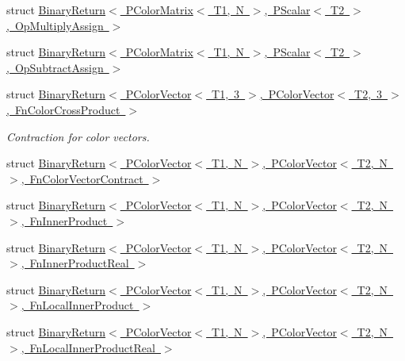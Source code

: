 \begin{DoxyCompactItemize}
\item 
struct \mbox{\hyperlink{structENSEM_1_1BinaryReturn_3_01PColorMatrix_3_01T1_00_01N_01_4_00_01PScalar_3_01T2_01_4_00_01OpMultiplyAssign_01_4}{Binary\+Return$<$ P\+Color\+Matrix$<$ T1, N $>$, P\+Scalar$<$ T2 $>$, Op\+Multiply\+Assign $>$}}
\item 
struct \mbox{\hyperlink{structENSEM_1_1BinaryReturn_3_01PColorMatrix_3_01T1_00_01N_01_4_00_01PScalar_3_01T2_01_4_00_01OpSubtractAssign_01_4}{Binary\+Return$<$ P\+Color\+Matrix$<$ T1, N $>$, P\+Scalar$<$ T2 $>$, Op\+Subtract\+Assign $>$}}
\item 
struct \mbox{\hyperlink{structENSEM_1_1BinaryReturn_3_01PColorVector_3_01T1_00_013_01_4_00_01PColorVector_3_01T2_00_013_ba40478e41b9dc719d7fd5b6b54bac05}{Binary\+Return$<$ P\+Color\+Vector$<$ T1, 3 $>$, P\+Color\+Vector$<$ T2, 3 $>$, Fn\+Color\+Cross\+Product $>$}}
\begin{DoxyCompactList}\small\item\em Contraction for color vectors. \end{DoxyCompactList}\item 
struct \mbox{\hyperlink{structENSEM_1_1BinaryReturn_3_01PColorVector_3_01T1_00_01N_01_4_00_01PColorVector_3_01T2_00_01N_62be6e61418b73621b95945775a1489e}{Binary\+Return$<$ P\+Color\+Vector$<$ T1, N $>$, P\+Color\+Vector$<$ T2, N $>$, Fn\+Color\+Vector\+Contract $>$}}
\item 
struct \mbox{\hyperlink{structENSEM_1_1BinaryReturn_3_01PColorVector_3_01T1_00_01N_01_4_00_01PColorVector_3_01T2_00_01N_01_4_00_01FnInnerProduct_01_4}{Binary\+Return$<$ P\+Color\+Vector$<$ T1, N $>$, P\+Color\+Vector$<$ T2, N $>$, Fn\+Inner\+Product $>$}}
\item 
struct \mbox{\hyperlink{structENSEM_1_1BinaryReturn_3_01PColorVector_3_01T1_00_01N_01_4_00_01PColorVector_3_01T2_00_01N_ff22724b5ff700ded585f8698a23ac47}{Binary\+Return$<$ P\+Color\+Vector$<$ T1, N $>$, P\+Color\+Vector$<$ T2, N $>$, Fn\+Inner\+Product\+Real $>$}}
\item 
struct \mbox{\hyperlink{structENSEM_1_1BinaryReturn_3_01PColorVector_3_01T1_00_01N_01_4_00_01PColorVector_3_01T2_00_01N_ed73dfc7a4532c23f28b4a2b6ca4e4e7}{Binary\+Return$<$ P\+Color\+Vector$<$ T1, N $>$, P\+Color\+Vector$<$ T2, N $>$, Fn\+Local\+Inner\+Product $>$}}
\item 
struct \mbox{\hyperlink{structENSEM_1_1BinaryReturn_3_01PColorVector_3_01T1_00_01N_01_4_00_01PColorVector_3_01T2_00_01N_c711f7ad00c17cacbd8ce82777076e9d}{Binary\+Return$<$ P\+Color\+Vector$<$ T1, N $>$, P\+Color\+Vector$<$ T2, N $>$, Fn\+Local\+Inner\+Product\+Real $>$}}

\end{DoxyCompactItemize}
